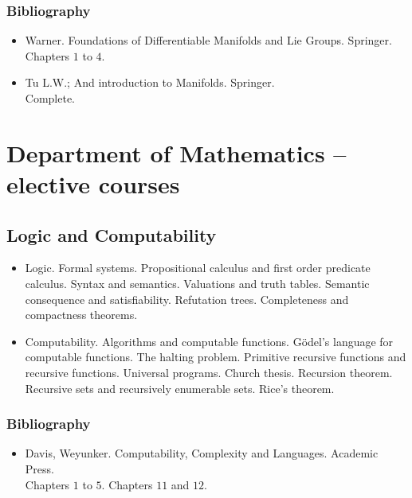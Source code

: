 \documentclass[spanish]{article}
\begin{document}
\subsubsection{Bibliography}
\begin{itemize}
  \item
Warner. Foundations of Differentiable Manifolds and Lie Groups. Springer.\\
Chapters $1$ to $4$.

  \item
Tu L.W.; And introduction to Manifolds. Springer.\\
Complete.

\end{itemize}


\hrulefill%

\section{Department of Mathematics -- elective courses}

\subsection{Logic and Computability}

\begin{itemize}
  \item
Logic. Formal systems. Propositional calculus and first order predicate calculus.
Syntax and semantics. Valuations and truth tables. Semantic consequence and satisfiability.
Refutation trees. Completeness and compactness theorems.

  \item
Computability. Algorithms and computable functions. G\"odel's language for computable
functions. The halting problem. Primitive recursive functions and recursive functions.
Universal programs. Church thesis. Recursion theorem. Recursive sets and recursively
enumerable sets. Rice's theorem.

\end{itemize}


\subsubsection{Bibliography}
\begin{itemize}
  \item
Davis, Weyunker. Computability, Complexity and Languages. Academic Press.\\
Chapters $1$ to $5$. Chapters $11$ and $12$.

\end{itemize}
\end{document}
